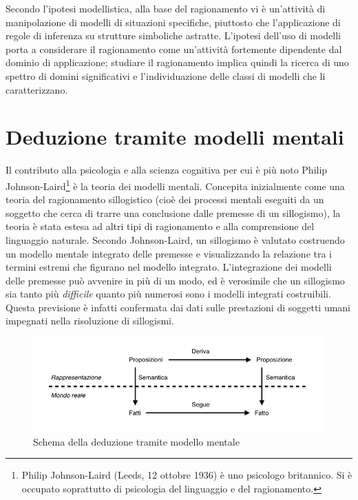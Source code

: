 Secondo l’ipotesi modellistica, alla base del ragionamento vi è un’attività di manipolazione di modelli di situazioni specifiche, piuttosto che l’applicazione di regole di inferenza su strutture simboliche astratte. L’ipotesi dell’uso di modelli porta a considerare il ragionamento come un’attività fortemente dipendente dal dominio di applicazione; studiare il ragionamento implica quindi la ricerca di uno spettro di domini significativi e l’individuazione delle classi di modelli che li caratterizzano.

\section{Deduzione tramite modelli mentali}
Il contributo alla psicologia e alla scienza cognitiva per cui è più noto Philip Johnson-Laird\footnote{Philip Johnson-Laird (Leeds, 12 ottobre 1936) è uno psicologo britannico. Si è occupato soprattutto di psicologia del linguaggio e del ragionamento.} è la teoria dei modelli mentali. Concepita inizialmente come una teoria del ragionamento sillogistico (cioè dei processi mentali eseguiti da un soggetto che cerca di trarre una conclusione dalle premesse di un sillogismo), la teoria è stata estesa ad altri tipi di ragionamento e alla comprensione del linguaggio naturale. Secondo Johnson-Laird, un sillogismo è valutato costruendo un modello mentale integrato delle premesse e visualizzando la relazione tra i termini estremi che figurano nel modello integrato. L'integrazione dei modelli delle premesse può avvenire in più di un modo, ed è verosimile che un sillogismo sia tanto più \emph{difficile} quanto più numerosi sono i modelli integrati costruibili. Questa previsione è infatti confermata dai dati sulle prestazioni di soggetti umani impegnati nella risoluzione di sillogismi.

\begin{figure}[hbt]
  \centering
  \includegraphics[width=\textwidth]{img/deduzione.png}
  \caption{Schema della deduzione tramite modello mentale}
  \label{fig:modello-mentale}
\end{figure}

